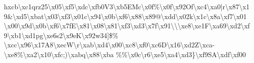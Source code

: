 \documentclass[11pt]{article}
\begin{document}
h{}xcb\textbackslash{}xc1qrz25\textbackslash{}x05\textbackslash{}xf5\textbackslash{}xdc\textbackslash{}xfb0V3\textbackslash{}xb5EMc\textbackslash{}x0f\%\textbackslash{}x0f\textbackslash{}x92Of\textbackslash{}xc4\textbackslash{}xa0|r\textbackslash{}x87\textbackslash{}x19\&\textbackslash{}xd5\textbackslash{}xbat\textbackslash{}x03\textbackslash{}xf3\textbackslash{}x01c\textbackslash{}x94\textbackslash{}x0b\textbackslash{}xf6\textbackslash{}x88\textbackslash{}x89@\textbackslash{}xdd\textbackslash{}x02k\textbackslash{}x1c\textbackslash{}x8a\textbackslash{}xf7\textbackslash{}x01\textbackslash{}x00\textbackslash{}x9d\textbackslash{}x0b\textbackslash{}xf6\textbackslash{}x7fE\textbackslash{}x81\textbackslash{}x08\textbackslash{}x81\textbackslash{}xf3\textbackslash{}xd3\textbackslash{}x7f\textbackslash{}x91\textbackslash{}\textbackslash{}\textbackslash{}xe8\textbackslash{}xe1F\textbackslash{}xa69\textbackslash{}xd2\textbackslash{}xf9\textbackslash{}xb1\textbackslash{}xd1pg\textbackslash{}xe6s2\textbackslash{}x9eK\textbackslash{}x92w34]\$\% \textbackslash{}xcc\textbackslash{}x96\textbackslash{}x17A8\textbackslash{}xecW\textbackslash{}r\textbackslash{}xab\textbackslash{}xd4\textbackslash{}x00\textbackslash{}xc8\textbackslash{}xf0\textbackslash{}xc6D\textbackslash{}x16\textbackslash{}xd2Z\textbackslash{}xca-\textbackslash{}xe8\%\textbackslash{}xa2\textbackslash{}x10\textbackslash{}xfc;)\textbackslash{}xabq\textbackslash{}x88\textbackslash{}xba \%\%\textbackslash{}x0c\textbackslash{}r6\textbackslash{}xe5\textbackslash{}xa4\textbackslash{}xd3\}\textbackslash{}xf9SA\textbackslash{}xdf\textbackslash{}xf00 
\end{document}
